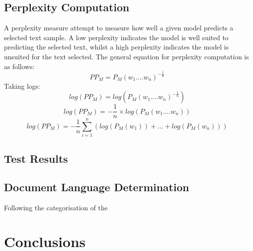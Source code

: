 \documentclass[12pt]{article}
\begin{document}
\subsection{Perplexity Computation}
A perplexity measure attempt to measure how well a given model predicts a selected text sample.  A low perplexity indicates the model is well suited to predicting the selected text, whilst a high perplexity indicates the model is unsuited for the text selected.  The general equation for perplexity computation is as follows:
\begin{equation}
	PP_{M} = P_{M}\left( w_{1}.... w_{n}\right)^{-\frac{1}{n}}
\end{equation}
Taking logs:
\begin{equation}
log\left(PP_{M}\right) = log\left(P_{M}\left( w_{1}.... w_{n}\right)^{-\frac{1}{n}}\right)
\end{equation}
\begin{equation}
log\left(PP_{M}\right) = -\frac{1}{n}\times log\left(P_{M}\left( w_{1}.... w_{n}\right)\right)
\end{equation}
\begin{equation}
log\left(PP_{M}\right) = -\frac{1}{n} \sum_{i=1} ^{n}\left( log(P_{M}(w_{1})) + ... + log(P_{M}(w_{n})) \right)
\end{equation}
\subsection{Test Results}



\subsection{Document Language Determination}
Following the categorisation of the 
%


\section{Conclusions}
\end{document}
